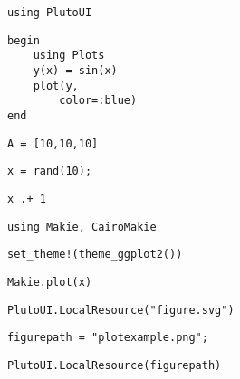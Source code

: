 \newpage

\begin{lstlisting}[language=JuliaLocal, style=julia]
using PlutoUI
\end{lstlisting}

\begin{lstlisting}[language=JuliaLocal, style=julia]
begin
	using Plots
	y(x) = sin(x)
	plot(y,
		color=:blue)
end
\end{lstlisting}

\begin{lstlisting}[language=JuliaLocal, style=julia]
A = [10,10,10]
\end{lstlisting}

\begin{lstlisting}[language=JuliaLocal, style=julia]
x = rand(10);
\end{lstlisting}

\begin{lstlisting}[language=JuliaLocal, style=julia]
x .+ 1
\end{lstlisting}

\begin{lstlisting}[language=JuliaLocal, style=julia]
using Makie, CairoMakie
\end{lstlisting}

\begin{lstlisting}[language=JuliaLocal, style=julia]
set_theme!(theme_ggplot2())
\end{lstlisting}

\begin{lstlisting}[language=JuliaLocal, style=julia]
Makie.plot(x)
\end{lstlisting}

\begin{lstlisting}[language=JuliaLocal, style=julia]
PlutoUI.LocalResource("figure.svg")
\end{lstlisting}

\begin{lstlisting}[language=JuliaLocal, style=julia]
figurepath = "plotexample.png";
\end{lstlisting}

\begin{lstlisting}[language=JuliaLocal, style=julia]
PlutoUI.LocalResource(figurepath)
\end{lstlisting}
